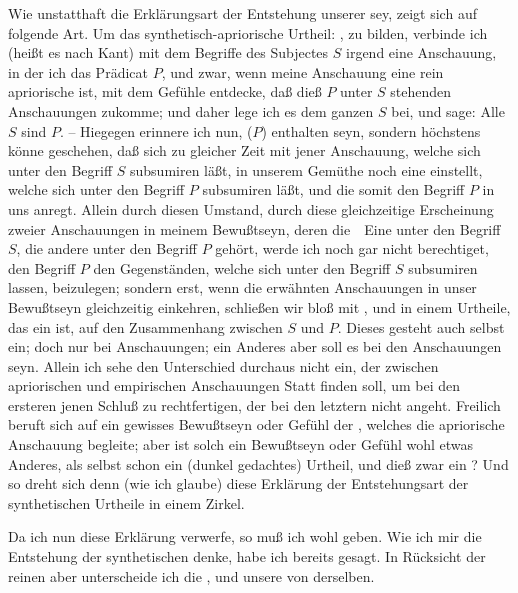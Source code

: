 \begin{aufza}
\begin{aufzb}
\item Wie unstatthaft die  Erklärungsart der Entstehung unserer  sey, zeigt sich auf folgende Art. Um das synthetisch-apriorische Urtheil: , zu bilden, verbinde ich (heißt es nach Kant) mit dem Begriffe des Subjectes $S$ irgend eine Anschauung, in der ich das Prädicat $P$, und zwar, wenn meine Anschauung eine rein apriorische ist, mit dem Gefühle entdecke, daß dieß $P$  unter $S$ stehenden Anschauungen zukomme; und daher lege ich es dem ganzen $S$ bei, und sage: Alle $S$ sind $P$. -- Hiegegen erinnere ich nun,  ($P$) enthalten seyn, sondern höchstens könne geschehen, daß sich zu gleicher Zeit mit jener Anschauung, welche sich unter den Begriff $S$ subsumiren läßt, in unserem Gemüthe noch eine  einstellt, welche sich unter den Begriff $P$ subsumiren läßt, und die somit den Begriff $P$ in uns anregt. Allein durch diesen Umstand, durch diese gleichzeitige Erscheinung zweier Anschauungen in meinem Bewußtseyn, deren die~\ Eine unter den Begriff $S$, die andere unter den Begriff $P$ gehört, werde ich noch gar nicht berechtiget, den Begriff $P$ den Gegenständen, welche sich unter den Begriff $S$ subsumiren lassen,  beizulegen; sondern erst, wenn die erwähnten Anschauungen  in unser Bewußtseyn gleichzeitig einkehren, schließen wir bloß mit , und in einem Urtheile, das ein  ist, auf den Zusammenhang zwischen $S$ und $P$. Dieses gesteht auch  selbst ein; doch nur bei  Anschauungen; ein Anderes aber soll es bei den  Anschauungen seyn. Allein ich sehe den Unterschied durchaus nicht ein, der zwischen apriorischen und empirischen Anschauungen Statt finden soll, um bei den ersteren jenen Schluß zu rechtfertigen, der bei den letztern nicht angeht. Freilich beruft sich  auf ein gewisses Bewußtseyn oder Gefühl der , welches die apriorische Anschauung begleite; aber ist solch ein Bewußtseyn oder Gefühl wohl etwas Anderes, als selbst schon ein (dunkel gedachtes) Urtheil, und dieß zwar ein ? Und so dreht sich denn (wie ich glaube) diese Erklärung der Entstehungsart der synthetischen Urtheile in einem Zirkel.
\item Da ich nun diese  Erklärung verwerfe, so muß ich wohl  geben. Wie ich mir die Entstehung der synthetischen  denke, habe ich bereits gesagt. In Rücksicht der reinen  aber unterscheide ich die , und unsere  von derselben.

\end{aufzb}
\end{aufza}
